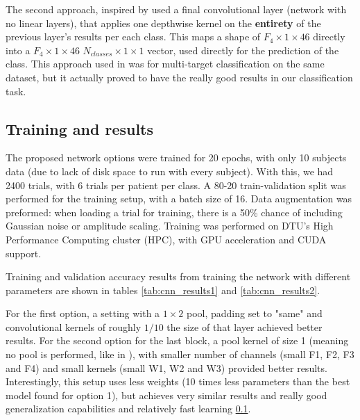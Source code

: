 The second approach, inspired by \cite{khok2020deep_goncalo} used a final convolutional layer (network with no linear layers), that applies one depthwise kernel on the \textbf{entirety} of the previous layer's results per each class. This maps a shape of $F_4\times1\times46$ directly into a $F_4\times1\times46$ $N_{classes} \times1\times1$ vector, used directly for the prediction of the class. This approach used in \cite{khok2020deep_goncalo} was for multi-target classification on the same dataset, but it actually proved to have the really good results in our classification task.






\subsection{Training and results}
The proposed network options were trained for 20 epochs, with only 10 subjects data (due to lack of disk space to run with every subject). With this, we had 2400 trials, with 6 trials per patient per class. A 80-20 train-validation split was performed for the training setup, with a batch size of 16.
Data augmentation was preformed: when loading a trial for training, there is a 50\% chance of including Gaussian noise or amplitude scaling.
Training was performed on DTU's High Performance Computing cluster (HPC), with GPU acceleration and CUDA support.

Training and validation accuracy results from training the network with different parameters are shown in tables \ref{tab:cnn_results1} and \ref{tab:cnn_results2}.

For the first option, a setting with a $1\times2$ pool, padding set to "same" and convolutional kernels of roughly $1/10$ the size of that layer achieved better results.
For the second option for the last block, a pool kernel of size 1 (meaning no pool is performed, like in \cite{khok2020deep_goncalo}), with smaller number of channels (small F1, F2, F3 and F4) and small kernels (small W1, W2 and W3) provided better results. Interestingly, this setup uses less weights (10 times less parameters than the best model found for option 1), but achieves very similar results and really good generalization capabilities and relatively fast learning \ref{}.


